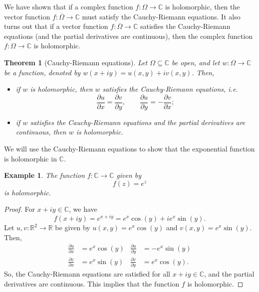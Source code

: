\documentclass[a4paper, openany]{memoir}
\theoremstyle{definition}
\theoremstyle{plain}
\newtheorem{theorem}[definition]{Theorem}
\newtheorem{example}[definition]{Example}
\begin{document}
We have shown that if a complex function $f: \Omega \to \mathbb{C}$ is holomorphic, then the vector function $f: \overline{\Omega} \to \mathbb{C}$ must satisfy the Cauchy-Riemann equations. It also turns out that if a vector function $f: \overline{\Omega} \to \mathbb{C}$ satisfies the Cauchy-Riemann equations (and the partial derivatives are continuous), then the complex function $f: \Omega \to \mathbb{C}$ is holomorphic.

\begin{theorem}[Cauchy-Riemann equations]
Let $\Omega \subseteq \mathbb{C}$ be open, and let $w: \Omega \to \mathbb{C}$ be a function, denoted by $w(x + iy) = u(x, y) + iv(x, y)$. Then, 
\begin{itemize}
    \item if $w$ is holomorphic, then $w$ satisfies the Cauchy-Riemann equations, i.e.
    \[\frac{\partial u}{\partial x} = \frac{\partial v}{\partial y}, \qquad \frac{\partial u}{\partial y} = -\frac{\partial v}{\partial x};\]
    \item if $w$ satisfies the Cauchy-Riemann equations and the partial derivatives are continuous, then $w$ is holomorphic.
\end{itemize}
\end{theorem}

We will use the Cauchy-Riemann equations to show that the exponential function is holomorphic in $\mathbb{C}$.
\begin{example}
The function $f: \mathbb{C} \to \mathbb{C}$ given by 
\[f(z) = e^z\]
is holomorphic.
\end{example}
\begin{proof}
For $x + iy \in \mathbb{C}$, we have
\[f(x + iy) = e^{x + iy} = e^x \cos (y) + ie^x \sin (y).\]
Let $u, v: \mathbb{R}^2 \to \mathbb{R}$ be given by $u(x, y) = e^x \cos (y)$ and $v(x, y) = e^x \sin (y)$. Then,
\begin{align*}
    \frac{\partial u}{\partial x} &= e^x \cos (y) & \frac{\partial u}{\partial y} &= -e^x \sin (y) \\
    \frac{\partial v}{\partial x} &= e^x \sin (y) & \frac{\partial v}{\partial y} &= e^x \cos (y).
\end{align*}
So, the Cauchy-Riemann equations are satisfied for all $x + iy \in \mathbb{C}$, and the partial derivatives are continuous. This implies that the function $f$ is holomorphic.
\end{proof}

\newpage
\end{document}
